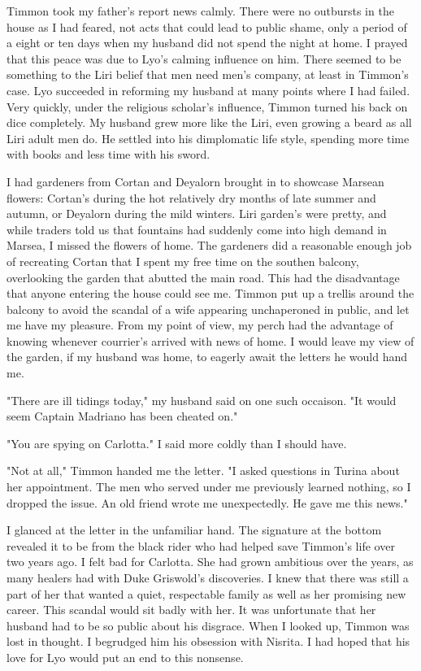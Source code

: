\documentclass{article}
\begin{document}
Timmon took my father's report news calmly. There were no outbursts in the house as I had feared, not acts that could lead to public shame, only a period of a eight or ten days when my husband did not spend the night at home. I prayed that this peace was due to Lyo's calming influence on him. There seemed to be something to the Liri belief that men need men's company, at least in Timmon's case. Lyo succeeded in reforming my husband at many points where I had failed. Very quickly, under the religious scholar's influence, Timmon turned his back on dice completely. My husband grew more like the Liri, even growing a beard as all Liri adult men do. He settled into his dimplomatic life style, spending more time with books and less time with his sword.

I had gardeners from Cortan and Deyalorn brought in to showcase Marsean flowers: Cortan's during the hot relatively dry months of late summer and autumn, or Deyalorn during the mild winters. Liri garden's were pretty, and while traders told us that fountains had suddenly come into high demand in Marsea, I missed the flowers of home. The gardeners did a reasonable enough job of recreating Cortan that I spent my free time on the southen balcony, overlooking the garden that abutted the main road. This had the disadvantage that anyone entering the house could see me. Timmon put up a trellis around the balcony to avoid the scandal of a wife appearing unchaperoned in public, and let me have my pleasure. From my point of view, my perch had the advantage of knowing whenever courrier's arrived with news of home. I would leave my view of the garden, if my husband was home, to eagerly await the letters he would hand me. 

"There are ill tidings today," my husband said on one such occaison. "It would seem Captain Madriano has been cheated on."

"You are spying on Carlotta." I said more coldly than I should have.

"Not at all," Timmon handed me the letter. "I asked questions in Turina about her appointment. The men who served under me previously learned nothing, so I dropped the issue. An old friend wrote me unexpectedly. He gave me this news."

I glanced at the letter in the unfamiliar hand. The signature at the bottom revealed it to be from the black rider who had helped save Timmon's life over two years ago. I felt bad for Carlotta. She had grown ambitious over the years, as many healers had with Duke Griswold's discoveries. I knew that there was still a part of her that wanted a quiet, respectable family as well as her promising new career. This scandal would sit badly with her. It was unfortunate that her husband had to be so public about his disgrace. When I looked up, Timmon was lost in thought. I begrudged him his obsession with Nisrita. I had hoped that his love for Lyo would put an end to this nonsense.
\end{document}
